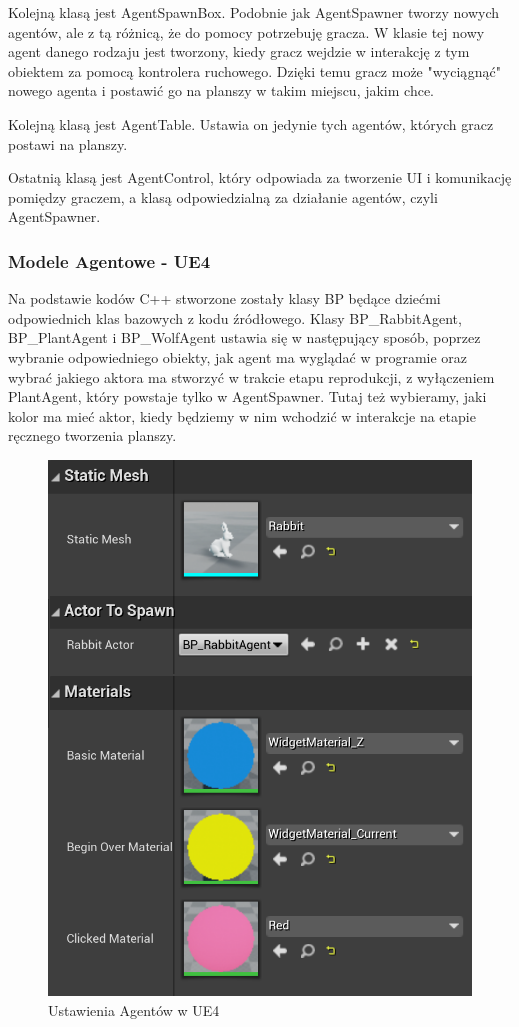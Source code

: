 \documentclass[a4paper,12pt,reqno]{article}
\begin{document}
Kolejną klasą jest AgentSpawnBox. Podobnie jak AgentSpawner tworzy nowych agentów, ale z tą różnicą, że do pomocy potrzebuję gracza. W klasie tej nowy agent danego rodzaju jest tworzony, kiedy gracz wejdzie w interakcję z tym obiektem za pomocą kontrolera ruchowego. Dzięki temu gracz może "wyciągnąć" nowego agenta i postawić go na planszy w takim miejscu, jakim chce.

Kolejną klasą jest AgentTable. Ustawia on jedynie tych agentów, których gracz postawi na planszy.

Ostatnią klasą jest AgentControl, który odpowiada za tworzenie UI i komunikację pomiędzy graczem, a klasą odpowiedzialną za działanie agentów, czyli AgentSpawner.

\subsubsection{Modele Agentowe - UE4}

Na podstawie kodów C++ stworzone zostały klasy BP będące dziećmi odpowiednich klas bazowych z kodu źródłowego. Klasy BP\_RabbitAgent, BP\_PlantAgent i BP\_WolfAgent ustawia się w następujący sposób, poprzez wybranie odpowiedniego obiekty, jak agent ma wyglądać w programie oraz wybrać jakiego aktora ma stworzyć w trakcie etapu reprodukcji, z wyłączeniem PlantAgent, który powstaje tylko w AgentSpawner. Tutaj też wybieramy, jaki kolor ma mieć aktor, kiedy będziemy w nim wchodzić w interakcje na etapie ręcznego tworzenia planszy.

\begin{figure}[H]%
\centering
\includegraphics[width=0.5\columnwidth]{graphics//agent/BP_AgentActor.png}
\caption{Ustawienia Agentów w UE4 
\label{BPExample}}%
%
\qquad
\end{figure} 
\end{document}
